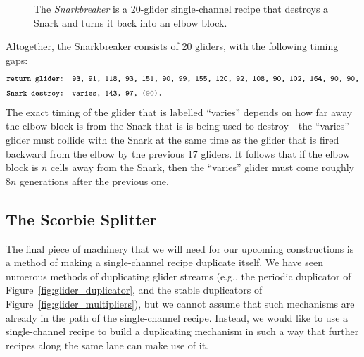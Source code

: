 \begin{figure}[!htb]
	\centering
	
	\caption{The \emph{Snarkbreaker} is a $20$-glider single-channel recipe that destroys a Snark and turns it back into an elbow block.}\label{fig:snarkbreaker}
\end{figure}

Altogether, the Snarkbreaker consists of 20 gliders, with the following timing gaps:
\begin{align*}
& \text{\texttt{\footnotesize return glider: {\footnotesize 93, 91, 118, 93, 151, 90, 99, 155, 120, 92, 108, 90, 102, 164, 90, 90,}}} \\
& \text{\texttt{\footnotesize Snark destroy: {\footnotesize varies, 143, 97, {\color{gray}(90)}.}}}
\end{align*}
The exact timing of the glider that is labelled ``varies'' depends on how far away the elbow block is from the Snark that is is being used to destroy---the ``varies'' glider must collide with the Snark at the same time as the glider that is fired backward from the elbow by the previous 17 gliders. It follows that if the elbow block is $n$ cells away from the Snark, then the ``varies'' glider must come roughly $8n$ generations after the previous one.



\subsection{The Scorbie Splitter}\label{sec:scorbie_splitter}

The final piece of machinery that we will need for our upcoming constructions is a method of making a single-channel recipe duplicate itself. We have seen numerous methods of duplicating glider streams (e.g., the periodic duplicator of Figure~\ref{fig:glider_duplicator}, and the stable duplicators of Figure~\ref{fig:glider_multipliers}), but we cannot assume that such mechanisms are already in the path of the single-channel recipe. Instead, we would like to use a single-channel recipe to build a duplicating mechanism in such a way that further recipes along the same lane can make use of it.

